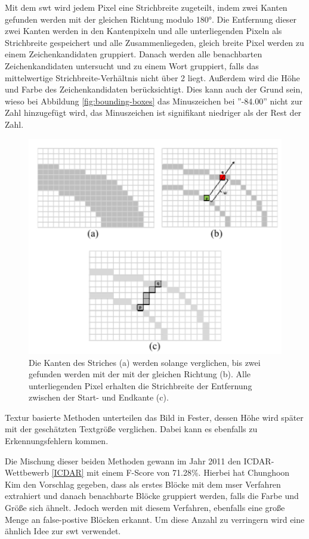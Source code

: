Mit dem \Gls{swt} wird jedem Pixel eine Strichbreite zugeteilt, indem zwei Kanten gefunden werden mit der gleichen Richtung modulo 180°. Die Entfernung dieser zwei Kanten werden in den Kantenpixeln und alle unterliegenden Pixeln als Strichbreite gespeichert und alle Zusammenliegeden, gleich breite Pixel werden zu einem Zeichenkandidaten gruppiert. Danach werden alle benachbarten Zeichenkandidaten untersucht und zu einem Wort gruppiert, falls das mittelwertige Strichbreite-Verhältnis nicht über 2 liegt. Außerdem wird die Höhe und Farbe des Zeichenkandidaten berücksichtigt. Dies kann auch der Grund sein, wieso bei Abbildung \ref{fig:bounding-boxes} das Minuszeichen bei ''-84.00'' nicht zur Zahl hinzugefügt wird, das Minuszeichen ist signifikant niedriger als der Rest der Zahl. \cite{SWT:online}

\begin{figure}[H]
    \centering
    \includegraphics[scale=0.7]{sections/machine-learning/images/SWT.png}
    \caption{Die Kanten des Striches (a) werden solange verglichen, bis zwei gefunden werden mit der mit der gleichen Richtung (b). Alle unterliegenden Pixel erhalten die Strichbreite der Entfernung zwischen der Start- und Endkante (c).}
\end{figure}

Textur basierte Methoden unterteilen das Bild in Fester, dessen Höhe wird später mit der geschätzten Textgröße verglichen. Dabei kann es ebenfalls zu Erkennungsfehlern kommen.

Die Mischung dieser beiden Methoden gewann im Jahr 2011 den ICDAR-Wettbewerb \ref*{ICDAR} mit einem F-Score von 71.28\%. Hierbei hat Chunghoon Kim den Vorschlag gegeben, dass als erstes Blöcke  mit dem \Gls{mser} Verfahren extrahiert und danach benachbarte Blöcke gruppiert werden, falls die Farbe und Größe sich ähnelt. Jedoch werden mit diesem Verfahren, ebenfalls eine große Menge an false-postive Blöcken erkannt. Um diese Anzahl zu verringern wird eine ähnlich Idee zur \gls{swt} verwendet. \cite{SWT:online}

